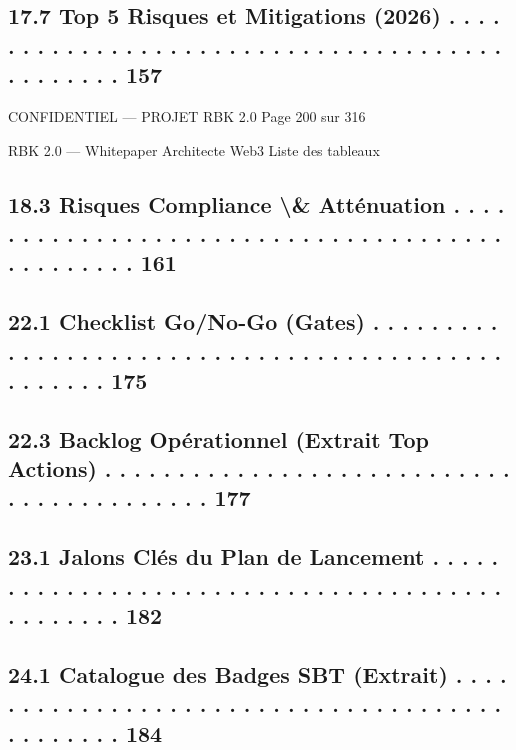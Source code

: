 \subsection{17.7 Top 5 Risques et Mitigations (2026) . . . . . . . . . . . . . . . . . . . . . . . . . . . . . . . . . . . . . . . . . . . . . . 157}
\vspace{0.5em}
\vspace{0.5em}
\vspace{0.5em}
\begin{confidential}CONFIDENTIEL — PROJET RBK 2.0                                   Page 200 sur 316\end{confidential}
RBK 2.0 — Whitepaper Architecte Web3                                                                                         Liste des tableaux\\
\vspace{0.5em}
\vspace{0.5em}
\subsection{18.3 Risques Compliance \textbackslash{}& Atténuation . . . . . . . . . . . . . . . . . . . . . . . . . . . . . . . . . . . . . . . . . . . . . . . 161}
\vspace{0.5em}
\subsection{22.1 Checklist Go/No-Go (Gates) . . . . . . . . . . . . . . . . . . . . . . . . . . . . . . . . . . . . . . . . . . . . . . . . . . 175}
\subsection{22.3 Backlog Opérationnel (Extrait Top Actions) . . . . . . . . . . . . . . . . . . . . . . . . . . . . . . . . . . . . . . . . . . 177}
\vspace{0.5em}
\subsection{23.1 Jalons Clés du Plan de Lancement . . . . . . . . . . . . . . . . . . . . . . . . . . . . . . . . . . . . . . . . . . . . . . . 182}
\vspace{0.5em}
\subsection{24.1 Catalogue des Badges SBT (Extrait) . . . . . . . . . . . . . . . . . . . . . . . . . . . . . . . . . . . . . . . . . . . . . . 184}
